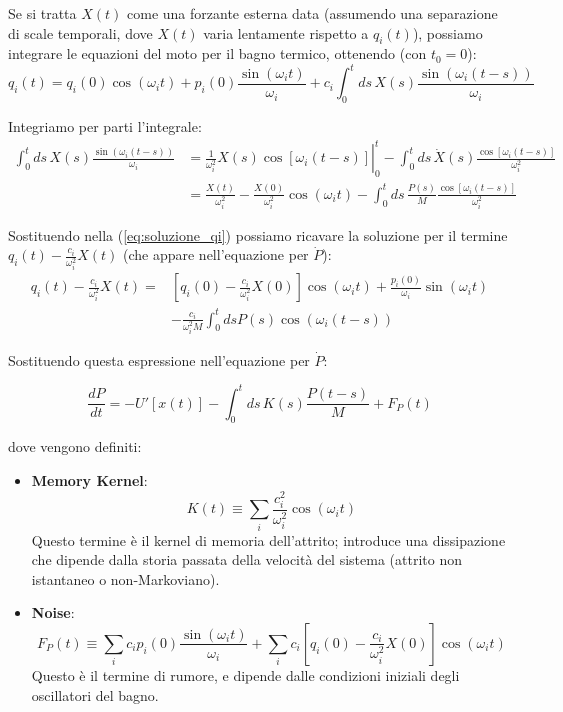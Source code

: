 Se si tratta $X(t)$ come una forzante esterna data (assumendo una separazione di scale temporali, dove $X(t)$ varia lentamente rispetto a $q_i(t)$), possiamo integrare le equazioni del moto per il bagno termico, ottenendo (con $t_0=0$):
\begin{equation} 
q_i(t) = q_i(0)\cos(\omega_i t) + p_i(0)\frac{\sin(\omega_i t)}{\omega_i} + c_i \int_0^t ds \, X(s) \frac{\sin(\omega_i(t-s))}{\omega_i} 
\label{eq:soluzione_qi}
\end{equation}

Integriamo per parti l'integrale:
\begin{align*} 
\int_0^t ds \, X(s) \frac{\sin(\omega_i(t-s))}{\omega_i} &= \left. \frac{1}{\omega_i^2} X(s) \cos[\omega_i(t-s)] \right|_0^t - \int_0^t ds \, \dot{X}(s) \frac{\cos[\omega_i(t-s)]}{\omega_i^2}  \\ 
&= \frac{X(t)}{\omega_i^2} - \frac{X(0)}{\omega_i^2}\cos(\omega_i t) - \int_0^t ds \, \frac{P(s)}{M} \frac{\cos[\omega_i(t-s)]}{\omega_i^2}
\end{align*}

Sostituendo nella (\ref{eq:soluzione_qi}) possiamo ricavare la soluzione per il termine $q_i(t) - \frac{c_i}{\omega_i^2}X(t)$ (che appare nell'equazione per $\dot{P}$):
\begin{align}
q_i(t) - \frac{c_i}{\omega_i^2}X(t) = & \left[q_i(0) - \frac{c_i}{\omega_i^2}X(0)\right]\cos(\omega_i t) + \frac{p_i(0)}{\omega_i}\sin(\omega_i t) \nonumber \\
& - \frac{c_i}{\omega_i^2 M} \int_0^t ds P(s) \cos(\omega_i(t-s))
\end{align}

Sostituendo questa espressione nell'equazione per $\dot{P}$:
\begin{tcolorbox}[
    colback=colorA!5,      
    colframe=colorA,       
    title={Equazione di Langevin Generalizzata},
    fonttitle=\bfseries\sffamily,
    arc=3mm,               
    boxrule=1.2pt
]
\begin{equation}
\frac{dP}{dt} = -U'[x(t)] -\int_0^t ds \, K(s) \frac{P(t-s)}{M} + F_P(t)
\end{equation}
\end{tcolorbox}

dove vengono definiti:
\begin{itemize}
    \item \textbf{Memory Kernel}:
    \begin{equation}
    K(t) \equiv \sum_i \frac{c_i^2}{\omega_i^2} \cos(\omega_i t)
    \end{equation}
    Questo termine è il kernel di memoria dell'attrito; introduce una dissipazione che dipende dalla storia passata della velocità del sistema (attrito non istantaneo o non-Markoviano).
    \item \textbf{Noise}:
    \begin{equation}
    F_P(t) \equiv \sum_i c_i p_i(0) \frac{\sin(\omega_i t)}{\omega_i} + \sum_i c_i \left[q_i(0) - \frac{c_i}{\omega_i^2} X(0)\right]\cos(\omega_i t)
    \end{equation}
    Questo è il termine di rumore, e dipende dalle condizioni iniziali degli oscillatori del bagno.
\end{itemize}

